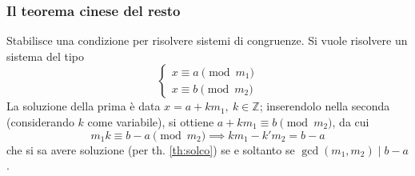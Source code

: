 \documentclass[11pt, a4paper]{scrartcl}
\theoremstyle{definition}
\numberwithin{esempio}{section}
\theoremstyle{definition}
\numberwithin{obs}{section}
\numberwithin{nota}{section}
\numberwithin{equation}{subsection}
\begin{document}
\subsubsection{Il teorema cinese del resto}

Stabilisce una condizione per risolvere sistemi di congruenze.
Si vuole risolvere un sistema del tipo 
\begin{equation}\label{sisp}
\begin{cases}
	x \equiv a\pmod{m_1}\\
	x \equiv b\pmod{m_2}
\end{cases}
\end{equation} 
La soluzione della prima \`e data $x = a + km_1, \ k \in \mathbb{Z}$; inserendolo nella seconda (considerando $k$ come variabile), si ottiene $a+ km_1 \equiv b \pmod{m_2} $, da cui
\[
m_1 k \equiv b -a \pmod{m_2} \implies k m_1 - k' m_2 = b-a
\] 
che si sa avere soluzione (per th. \ref{th:solco}) se e soltanto se $\operatorname{gcd}(m_1,m_2)  \mid b-a$.
\end{document}
